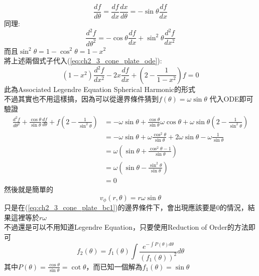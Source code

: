\documentclass[../main.tex]{subfiles}
\begin{document}
\begin{itemize}
\begin{enumerate}
\begin{equation}
      \frac{df}{d\theta} = \frac{df}{dx}\frac{dx}{d\theta} = -\sin\theta \frac{df}{dx}
    \end{equation}
    同理:
    \begin{equation}
      \frac{d^2 f}{d \theta^2} = -\cos\theta \frac{df}{dx} + \sin^2\theta \frac{d^2 f}{d x^2}
    \end{equation}
    而且$\sin^2\theta = 1 - \cos^2\theta = 1 - x^2$\\
    將上述兩個式子代入(\ref{eq:ch2_3_cone_plate_ode}):
    \begin{equation}
      \boxed{\left(1-x^2\right)\frac{d^2 f}{d x^2} - 2x \frac{df}{dx} + \left(2 - \frac{1}{1-x^2}\right)f = 0}
    \end{equation}
    此為Associated Legendre Equation Spherical Harmonic的形式\\
    不過其實也不用這樣搞，因為可以從邊界條件猜到$f(\theta)=\omega\sin\theta$
    代入ODE即可驗證
    \begin{align}
      \frac{d^2 f}{d \theta^2} + \frac{\cos\theta}{\sin\theta}\frac{d f}{d \theta}
        + f\left(2 - \frac{1}{\sin^2\theta}\right) &= 
      -\omega \sin\theta + \frac{\cos\theta}{\sin\theta} \omega \cos\theta
        + \omega \sin\theta \left(2 - \frac{1}{\sin^2\theta}\right) \nonumber\\
      &= -\omega \sin\theta + \omega \frac{\cos^2\theta}{\sin\theta}
        + 2\omega \sin\theta - \omega \frac{1}{\sin\theta} \nonumber\\
      &= \omega \left(
        \sin\theta + \frac{\cos^2\theta - 1}{\sin\theta}
      \right) \nonumber\\
      &= \omega \left(
        \sin\theta - \frac{\sin^2\theta}{\sin\theta}
      \right) \nonumber\\
      &= 0
    \end{align}
    然後就是簡單的
    \begin{equation}
      v_\phi (r,\theta) = r \omega \sin\theta
    \end{equation}
    只是在(\ref{eq:ch2_3_cone_plate_bc1})的邊界條件下，會出現應該要是0的情況，結果這裡等於$r\omega$\\
    不過還是可以不用知道Legendre Equation，只要使用Reduction of Order的方法即可
    \begin{equation}
      f_2(\theta) = f_1(\theta) \int \frac{e^{-\int P(\theta) d\theta}}{(f_1(\theta))^2} d\theta
    \end{equation}
    其中$P(\theta) = \frac{\cos\theta}{\sin\theta}= \cot\theta$，而已知一個解為$f_1(\theta) = \sin\theta$\\

\end{enumerate}
\end{itemize}
\end{document}
